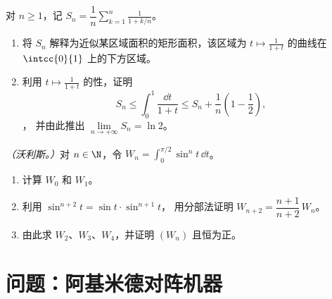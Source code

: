 \begin{exercise}[$\star\star\star$]\label{exo:g12:integ:8}
对 $n \geq 1$，记 $S_n = \dfrac1n \displaystyle\sum_{k=1}^{n} \frac{1}{1 + k/n}$。
\begin{enumerate}
  \item 将 $S_n$ 解释为近似某区域面积的矩形面积，该区域为
        $t \mapsto \frac{1}{1+t}$ 的曲线在 $\intcc{0}{1}$ 上的下方区域。
  \item 利用 $t \mapsto \frac{1}{1+t}$ 的性，证明
        \[
        S_n \leq \int_0^1 \frac{\dd t}{1+t} \leq S_n + \frac1n\left(1 - \frac12\right),
        \]，
        并由此推出 $\lim\limits_{n\to+\infty} S_n = \ln 2$。
\end{enumerate}
\end{exercise}

\begin{exercise}[$\star\star\star$]\label{exo:g12:integ:9}
\emph{（沃利斯。）}对 $n \in \N$，令
$W_n = \displaystyle\int_0^{\pi/2} \sin^n t\,\dd t$。
\begin{enumerate}
  \item 计算 $W_0$ 和 $W_1$。
  \item 利用 $\sin^{n+2}t = \sin t \cdot \sin^{n+1} t$，
        用分部法证明 $W_{n+2} = \dfrac{n+1}{n+2}\,W_n$。
  \item 由此求 $W_2$、$W_3$、$W_4$，并证明 $(W_n)$ 
        且恒为正。
\end{enumerate}
\end{exercise}

\section{问题：阿基米德对阵机器}

